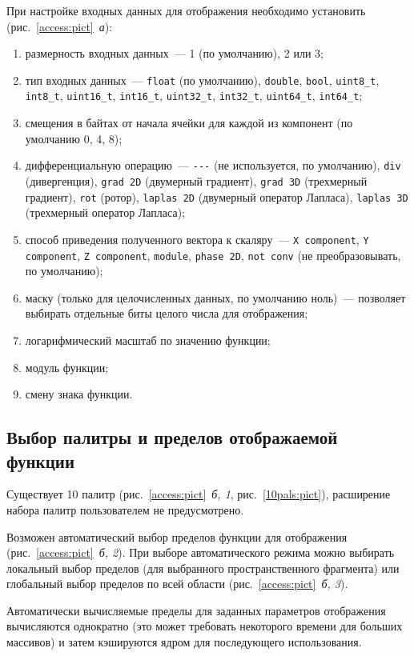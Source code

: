 \documentclass[12pt]{article}
\begin{document}
При настройке входных данных для отображения необходимо установить (рис.~\ref{access:pict}~{\it а}):
\begin{enumerate}
\item размерность входных данных~--- 1 (по умолчанию), 2 или 3;
\item тип входных данных~--- \verb'float' (по умолчанию), \verb'double', \verb'bool', \verb'uint8_t', \verb'int8_t', \verb'uint16_t', \verb'int16_t', \verb'uint32_t', \verb'int32_t', \verb'uint64_t', \verb'int64_t';
\item смещения в байтах от начала ячейки для каждой из компонент (по умолчанию 0, 4, 8);
\item дифференциальную операцию~--- \verb'---' (не используется, по умолчанию), \verb'div' (дивергенция),
  \verb'grad 2D' (двумерный градиент), \verb'grad 3D' (трехмерный градиент), \verb'rot' (ротор), \verb'laplas 2D' (двумерный оператор Лапласа),
  \verb'laplas 3D' (трехмерный оператор Лапласа);
\item способ приведения полученного вектора к скаляру~--- \verb'X component', \verb'Y component', \verb'Z component', \verb'module', \verb'phase 2D', \verb'not conv'
  (не преобразовывать, по умолчанию);
\item маску (только для целочисленных данных, по умолчанию ноль)~--- позволяет выбирать отдельные биты
  целого числа для отображения;
\item логарифмический масштаб по значению функции;
\item модуль функции;
\item смену знака функции.
\end{enumerate}


\subsection{Выбор палитры  и пределов отображаемой функции}
Существует 10 палитр (рис.~\ref{access:pict}~{\it б, 1}, рис.~\ref{10pals:pict}), расширение набора палитр пользователем не предусмотрено. 

Возможен автоматический выбор пределов функции для отображения (рис.~\ref{access:pict}~{\it б, 2}).
При выборе автоматического режима можно выбирать локальный выбор пределов (для выбранного пространственного фрагмента)
или глобальный выбор пределов по всей области (рис.~\ref{access:pict}~{\it б, 3}). 

Автоматически вычисляемые пределы для заданных параметров отображения вычисляются однократно (это может требовать некоторого времени
для больших массивов) и затем кэшируются ядром для последующего использования.
\end{document}
